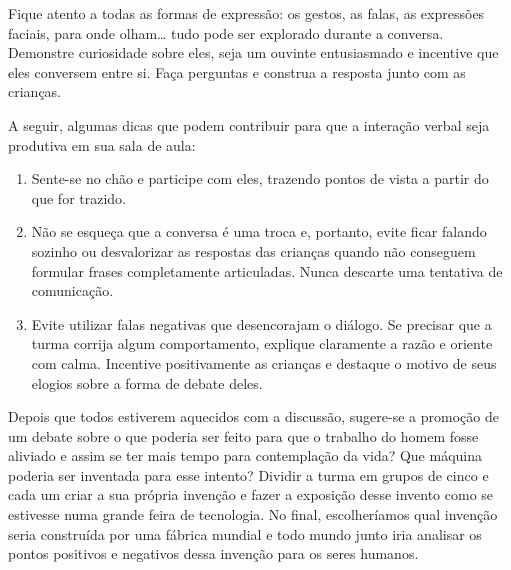 \documentclass[11pt]{extarticle}
\begin{document}
Fique atento a todas as formas de expressão: os gestos, as falas, as 
expressões faciais, para onde olham\ldots{} tudo pode ser explorado durante a conversa. 
Demonstre curiosidade sobre eles, seja um ouvinte entusiasmado e incentive que eles 
conversem entre si. Faça perguntas e construa a resposta junto com as crianças. 

A seguir, algumas dicas que podem contribuir para que a interação verbal seja produtiva em sua sala de aula: 

\begin{enumerate}
\item Sente-se no chão e participe com eles, trazendo pontos de vista a partir do que for trazido.

\item Não se esqueça que a conversa é uma troca e, portanto, evite ficar falando sozinho ou desvalorizar as respostas das 
crianças quando não conseguem formular frases completamente articuladas. Nunca descarte uma tentativa de comunicação. 

\item Evite utilizar falas negativas que desencorajam o diálogo. Se precisar que a turma corrija algum comportamento, explique claramente a razão e oriente com calma. Incentive positivamente as crianças e destaque o motivo de seus elogios sobre a forma de debate deles. 

\end{enumerate}

Depois que todos estiverem aquecidos com a discussão, sugere-se a promoção de um debate sobre o que poderia ser feito para que o trabalho do homem fosse aliviado e assim se ter mais tempo para contemplação da vida? Que máquina poderia ser inventada para esse intento? Dividir a turma em grupos de cinco e cada um criar a sua própria invenção e fazer a exposição desse invento como se estivesse numa grande feira de tecnologia. No final, escolheríamos qual invenção seria construída por uma fábrica mundial e todo mundo junto iria analisar os pontos positivos e negativos dessa invenção para os seres humanos.

\end{document}
